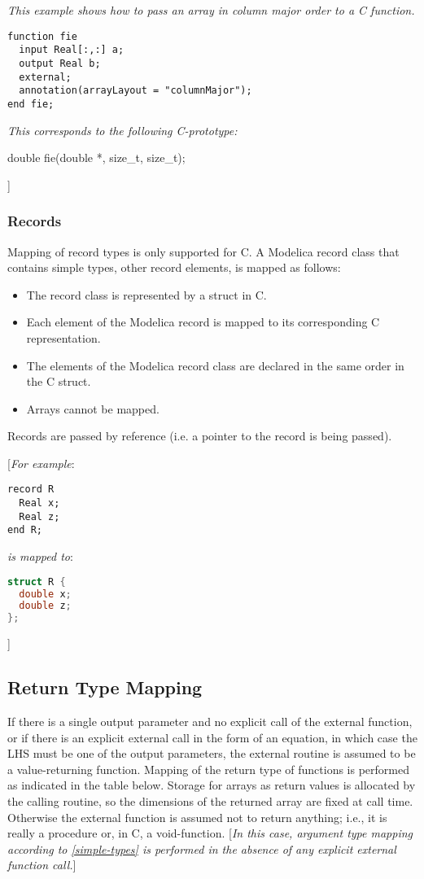\emph{This example shows how to pass an array in column major order to a
C function.}

\begin{lstlisting}[language=modelica]
function fie
  input Real[:,:] a;
  output Real b;
  external;
  annotation(arrayLayout = "columnMajor");
end fie;
\end{lstlisting}
\emph{This corresponds to the following C-prototype:}

double fie(double *, size\_t, size\_t);

{]}

\subsubsection{Records}

Mapping of record types is only supported for C. A Modelica record class
that contains simple types, other record elements, is mapped as follows:

\begin{itemize}
\item
  The record class is represented by a struct in C.
\item
  Each element of the Modelica record is mapped to its corresponding C
  representation.
\item
  The elements of the Modelica record class are declared in the same
  order in the C struct.
\item
  Arrays cannot be mapped.
\end{itemize}

Records are passed by reference (i.e. a pointer to the record is being
passed).

{[}\emph{For example}:

\begin{lstlisting}[language=modelica]
record R
  Real x;
  Real z;
end R;
\end{lstlisting}
\emph{is mapped to}:
\begin{lstlisting}[language=C]
struct R {
  double x;
  double z;
};
\end{lstlisting}

{]}

\subsection{Return Type Mapping}

If there is a single output parameter and no explicit call of the
external function, or if there is an explicit external call in the form
of an equation, in which case the LHS must be one of the output
parameters, the external routine is assumed to be a value-returning
function. Mapping of the return type of functions is performed as
indicated in the table below. Storage for arrays as return values is
allocated by the calling routine, so the dimensions of the returned
array are fixed at call time. Otherwise the external function is assumed
not to return anything; i.e., it is really a procedure or, in C, a
void-function. {[}\emph{In this case, argument type mapping according to
\autoref{simple-types} is performed in the absence of any explicit
external function call.}{]}

